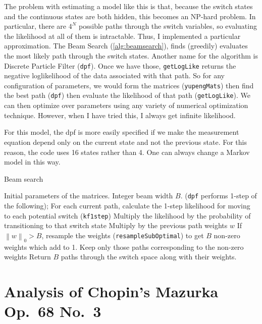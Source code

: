 \documentclass[12pt]{article}
\newcommand{\norm}[1]{\left\lVert #1 \right\rVert}
\begin{document}
The problem with estimating a model like this is that, because the
switch states and the continuous states are both hidden, this becomes
an NP-hard problem. In particular, there are $4^N$ possible paths
through the switch variables, so evaluating the likelihood at all of
them is intractable. Thus, I implemented a particular
approximation. The Beam Search (\autoref{alg:beamsearch}), finds
(greedily) evaluates the most likely path through the switch
states. Another name for the algorithm is Discrete Particle Filter
(\texttt{dpf}). Once we have those, \texttt{getLogLike} returns the
negative 
loglikelihood of the data associated with that path. So for any
configuration of parameters, we would form the matrices
(\texttt{yupengMats}) then find the best path (\texttt{dpf}) then
evaluate the likelihood of that path (\texttt{getLogLike}). We can
then optimize over parameters using any variety of numerical
optimization technique. However, when I have tried this, I always get
infinite likelihood.

For this model, the dpf is more easily specified if we make the
measurement equation depend only on the current state and not the
previous state. For this reason, the code uses 16 states rather than
4. One can always change a Markov model in this way.

\begin{algorithm}[t!]
  \caption{Beam search\label{alg:beamsearch}}
  \begin{algorithmic}[1]
  Initial parameters of the matrices. Integer beam width $B$.
  \STATE (\texttt{dpf} performs 1-step of the following);
  \STATE For each current path, calculate the 1-step likelihood for
  moving to each potential switch (\texttt{kf1step})\;
  \STATE Multiply the likelihood by the probability of transitioning
  to that switch state\;
  \STATE Multiply by the previous path weights $w$\;
  \STATE If $\norm{w}_0>B$, resample the weights\;
  (\texttt{resampleSubOptimal}) to get $B$ non-zero weights which
  add to 1.\;
  \STATE Keep only those paths corresponding to the non-zero weights\;
  \ENDFOR
  \STATE Return $B$ paths through the switch space along with their weights.\;
\end{algorithmic}
\end{algorithm}


\section{Analysis of Chopin's Mazurka Op.\ 68 No.\ 3}
\end{document}

